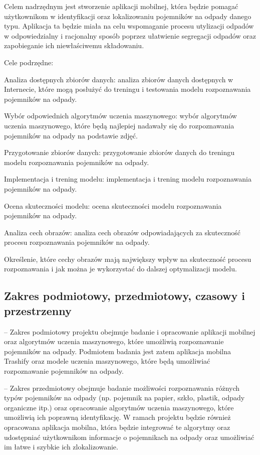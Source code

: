 \documentclass[12pt,oneside]{book}
\begin{document}
Celem nadrzędnym jest stworzenie aplikacji mobilnej, która będzie pomagać użytkownikom w identyfikacji oraz lokalizowaniu pojemników na odpady danego typu. Aplikacja ta będzie miała na celu wspomaganie procesu utylizacji odpadów w odpowiedzialny i racjonalny sposób poprzez ułatwienie segregacji odpadów oraz zapobieganie ich niewłaściwemu składowaniu.

Cele podrzędne:

    Analiza dostępnych zbiorów danych: analiza zbiorów danych dostępnych w Internecie, które mogą posłużyć do treningu i testowania modelu rozpoznawania pojemników na odpady.

    Wybór odpowiednich algorytmów uczenia maszynowego: wybór algorytmów uczenia maszynowego, które będą najlepiej nadawały się do rozpoznawania pojemników na odpady na podstawie zdjęć.

    Przygotowanie zbiorów danych: przygotowanie zbiorów danych do treningu modelu rozpoznawania pojemników na odpady.

    Implementacja i trening modelu: implementacja i trening modelu rozpoznawania pojemników na odpady.

    Ocena skuteczności modelu: ocena skuteczności modelu rozpoznawania pojemników na odpady.

    Analiza cech obrazów: analiza cech obrazów odpowiadających za skuteczność procesu rozpoznawania pojemników na odpady.

    Określenie, które cechy obrazów mają największy wpływ na skuteczność procesu rozpoznawania i jak można je wykorzystać do dalszej optymalizacji modelu.

\subsection{Zakres podmiotowy, przedmiotowy, czasowy i przestrzenny}

-- Zakres podmiotowy projektu \topic  obejmuje badanie i opracowanie aplikacji mobilnej oraz algorytmów uczenia maszynowego, które umożliwią rozpoznawanie pojemników na odpady. Podmiotem badania jest zatem aplikacja mobilna Trashify oraz modele uczenia maszynowego, które będą umożliwiać rozpoznawanie pojemników na odpady.

-- Zakres przedmiotowy obejmuje badanie możliwości rozpoznawania różnych typów pojemników na odpady (np. pojemnik na papier, szkło, plastik, odpady organiczne itp.) oraz opracowanie algorytmów uczenia maszynowego, które umożliwią ich poprawną identyfikację. W ramach projektu będzie również opracowana aplikacja mobilna, która będzie integrować te algorytmy oraz udostępniać użytkownikom informacje o pojemnikach na odpady oraz umożliwiać im łatwe i szybkie ich zlokalizowanie.
\end{document}
